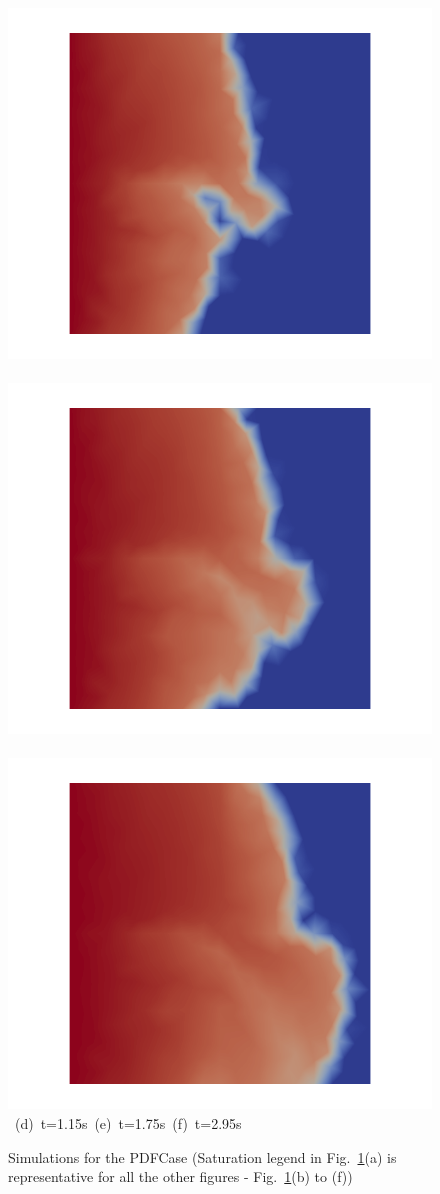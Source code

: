 \begin{landscape}
\begin{figure}[ht]
{\vspace{0.5cm}
\hbox{
      \includegraphics[width=.56\textwidth]{./Pics/PDFCase/PDFCase_Saturation_t_1dot15.png}
      \includegraphics[width=.56\textwidth]{./Pics/PDFCase/PDFCase_Saturation_t_1dot75.png} 
      \includegraphics[width=.56\textwidth]{./Pics/PDFCase/PDFCase_Saturation_t_2dot95.png}}
\vspace{0.cm}
\hbox{ \hspace{2.5cm} (d) t=1.15s \hspace{5.5cm} (e) t=1.75s   \hspace{5.5cm} (f) t=2.95s}
\vspace{0.cm}
}   
\caption{Simulations for the PDFCase (Saturation legend in Fig.~\ref{fig:PDFCase_Saturation}(a) is representative for all the other figures - \ie Fig.~\ref{fig:PDFCase_Saturation}(b) to (f))}
\label{fig:PDFCase_Saturation}
\end{figure}
\end{landscape}
\clearpage



